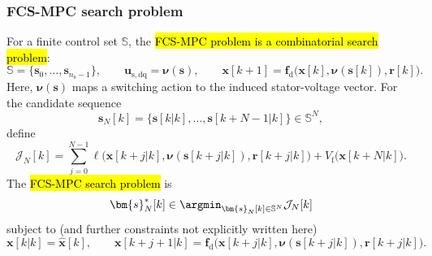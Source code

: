 \begin{frame}
	\frametitle{FCS-MPC search problem}
	For a finite control set $\mathbb{S}$, the \hl{FCS-MPC problem is a combinatorial search problem}:
	\begin{equation}
		\mathbb{S}=\{\bm{s}_0,\ldots,\bm{s}_{n_{\mathrm{s}}-1}\},
		\qquad
		\bm{u}_{\mathrm{s},\mathrm{dq}}=\bm{\nu}(\bm{s}),
		\qquad
		\bm{x}[k+1]=\bm{f}_{\mathrm{d}}\bigl(\bm{x}[k],\bm{\nu}(\bm{s}[k]),\bm{r}[k]\bigr).
	\end{equation}\pause%
	Here, $\bm{\nu}(\bm{s})$ maps a switching action to the induced stator-voltage vector.
	For the candidate sequence
	\begin{equation}
		\bm{s}_{N}[k]
		=\{\bm{s}[k|k],\ldots,\bm{s}[k+N-1|k]\}\in\mathbb{S}^{N},
	\end{equation}\pause%
	define
	\begin{equation}
		\mathcal{J}_{N}[k]
		=\sum_{j=0}^{N-1}\ell\bigl(\bm{x}[k+j|k],\bm{\nu}(\bm{s}[k+j|k]),\bm{r}[k+j|k]\bigr)
		+V_{\mathrm{f}}\bigl(\bm{x}[k+N|k]\bigr).
	\end{equation}\pause%
	The \hl{FCS-MPC search problem} is
	\begin{equation}
		\bm{s}_{N}^{*}[k]\in\argmin_{\bm{s}_{N}[k]\in\mathbb{S}^{N}}\mathcal{J}_{N}[k]
	\end{equation}
	subject to (and further constraints not explicitly written here)
	\begin{equation}
		\bm{x}[k|k]=\hat{\bm{x}}[k],
		\qquad
		\bm{x}[k+j+1|k]=\bm{f}_{\mathrm{d}}\bigl(\bm{x}[k+j|k],\bm{\nu}(\bm{s}[k+j|k]),\bm{r}[k+j|k]\bigr).
	\end{equation}
\end{frame}

